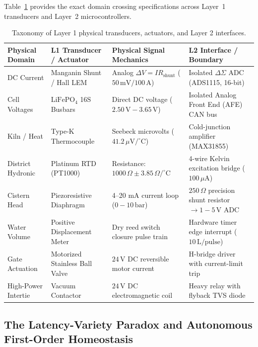 Table~\ref{tab:transducer-taxonomy} provides the exact domain crossing specifications across Layer~1 transducers and Layer~2 microcontrollers.

\begin{table}[htbp]
\centering
\small
\setlength{\tabcolsep}{3pt}
\begin{tabular}{|p{}|p{}|p{}|p{}|}
\hline
\textbf{Physical Domain} & \textbf{L1 Transducer / Actuator} & \textbf{Physical Signal Mechanics} & \textbf{L2 Interface / Boundary} \\
\hline
DC Current & Manganin Shunt / Hall LEM & Analog $\Delta V = I R_{\mathrm{shunt}}$ ($50\,\mathrm{mV}/100\,\mathrm{A}$) & Isolated $\Delta\Sigma$ ADC (ADS1115, 16-bit) \\
\hline
Cell Voltages & $\mathrm{LiFePO}_4$ 16S Busbars & Direct DC voltage ($2.50\,\mathrm{V}-3.65\,\mathrm{V}$) & Isolated Analog Front End (AFE) CAN bus \\
\hline
Kiln / Heat & Type-K Thermocouple & Seebeck microvolts ($41.2\,\mu\mathrm{V}/^\circ\mathrm{C}$) & Cold-junction amplifier (MAX31855) \\
\hline
District Hydronic & Platinum RTD (PT1000) & Resistance: $1000\,\Omega \pm 3.85\,\Omega/^\circ\mathrm{C}$ & 4-wire Kelvin excitation bridge ($100\,\mu\mathrm{A}$) \\
\hline
Cistern Head & Piezoresistive Diaphragm & 4--20 mA current loop ($0-10\,\mathrm{bar}$) & $250\,\Omega$ precision shunt resistor $\to 1-5\,\mathrm{V}$ ADC \\
\hline
Water Volume & Positive Displacement Meter & Dry reed switch closure pulse train & Hardware timer edge interrupt ($10\,\mathrm{L/pulse}$) \\
\hline
Gate Actuation & Motorized Stainless Ball Valve & $24\,\mathrm{V}$ DC reversible motor current & H-bridge driver with current-limit trip \\
\hline
High-Power Intertie & Vacuum Contactor & $24\,\mathrm{V}$ DC electromagnetic coil & Heavy relay with flyback TVS diode \\
\hline
\end{tabular}
\caption{Taxonomy of Layer 1 physical transducers, actuators, and Layer 2 interfaces.}
\label{tab:transducer-taxonomy}
\end{table}

\subsection{The Latency-Variety Paradox and Autonomous First-Order Homeostasis}

